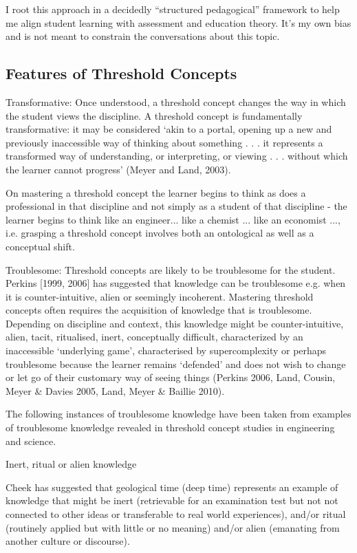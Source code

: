 \documentclass{tufte-book}\usepackage[]{graphicx}\usepackage[]{xcolor}
\begin{document}
I root this approach in a decidedly ``structured pedagogical'' framework to help me align student learning with assessment and education theory. It's my own bias and is not meant to constrain the conversations about this topic.


\subsection{Features of Threshold Concepts}

Transformative: Once understood, a threshold concept changes the way in which the student views the discipline.  A threshold concept is fundamentally transformative: it may be considered ‘akin to a portal, opening up a new and previously inaccessible way of thinking about something . . . it represents a transformed way of understanding, or interpreting, or viewing . . . without which the learner cannot progress’ (Meyer and Land, 2003).

On mastering a threshold concept the learner begins to think as does a professional in that discipline and not simply as a student of that discipline - the learner begins to think like an engineer... like a chemist ... like an economist ..., i.e. grasping a threshold concept involves both an ontological as well as a conceptual shift.

Troublesome: Threshold concepts are likely to be troublesome for the student. Perkins [1999, 2006] has suggested that knowledge can be troublesome e.g. when it is counter-intuitive, alien or seemingly incoherent. Mastering threshold concepts often requires the acquisition of knowledge that is troublesome. Depending on discipline and context, this knowledge might be counter-intuitive, alien, tacit, ritualised, inert, conceptually difficult, characterized by an inaccessible ‘underlying game’, characterised by supercomplexity or perhaps troublesome because the learner remains ‘defended’ and does not wish to change or let go of their customary way of seeing things (Perkins 2006, Land, Cousin, Meyer \& Davies 2005, Land, Meyer \& Baillie 2010).

The following instances of troublesome knowledge have been taken from examples of troublesome knowledge revealed in threshold concept studies in engineering and science.

Inert, ritual or alien knowledge

Cheek has suggested that geological time (deep time) represents an example of knowledge that might be inert (retrievable for an examination test but not not connected to other ideas or transferable to real world experiences), and/or ritual (routinely applied but with little or no meaning) and/or alien (emanating from another culture or discourse).
\end{document}
